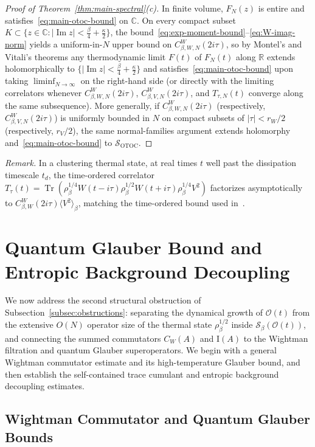 \documentclass[11pt,a4paper]{article}
\numberwithin{equation}{section}
\theoremstyle{plain}
\theoremstyle{definition}
\newcommand{\Tr}{\operatorname{Tr}}
\begin{document}
\begin{proof}[Proof of Theorem~\ref{thm:main-spectral}(c)]
In finite volume, $F_N(z)$ is entire and satisfies~\eqref{eq:main-otoc-bound} on $\mathbb{C}$. On every compact subset $K\subset\{z\in\mathbb{C} : |\operatorname{Im}z| < \frac{\beta}{4}+\frac{\kappa}{2}\}$, the bound~\eqref{eq:exp-moment-bound}--\eqref{eq:W-imag-norm} yields a uniform-in-$N$ upper bound on $C_{\beta,W,N}^W(2i\tau)$, so by Montel's and Vitali's theorems any thermodynamic limit $F(t)$ of $F_N(t)$ along $\mathbb{R}$ extends holomorphically to $\{|\operatorname{Im}z| < \frac{\beta}{4}+\frac{\kappa}{2}\}$ and satisfies~\eqref{eq:main-otoc-bound} upon taking $\liminf_{N\to\infty}$ on the right-hand side (or directly with the limiting correlators whenever $C_{\beta,W,N}^W(2i\tau)$, $C_{\beta,V,N}^W(2i\tau)$, and $T_{\tau,N}(t)$ converge along the same subsequence). More generally, if $C_{\beta,W,N}^W(2i\tau)$ (respectively, $C_{\beta,V,N}^W(2i\tau)$) is uniformly bounded in $N$ on compact subsets of $|\tau| < r_W/2$ (respectively, $r_V/2$), the same normal-families argument extends holomorphy and~\eqref{eq:main-otoc-bound} to $\mathcal{S}_{\mathrm{OTOC}}$.
\end{proof}

\noindent\emph{Remark.}
In a clustering thermal state, at real times $t$ well past the dissipation timescale $t_d$, the time-ordered correlator $T_\tau(t) = \Tr(\rho_\beta^{1/4}W(t-i\tau)\rho_\beta^{1/2}W(t+i\tau)\rho_\beta^{1/4}V^2)$ factorizes asymptotically to $C_{\beta,W}^W(2i\tau)\langle V^2\rangle_\beta$, matching the time-ordered bound used in~\cite{MSS2016}.

\section{Quantum Glauber Bound and Entropic Background Decoupling}\label{sec:entropic}

We now address the second structural obstruction of Subsection~\ref{subsec:obstructions}: separating the dynamical growth of $\mathcal{O}(t)$ from the extensive $O(N)$ operator size of the thermal state $\rho_\beta^{1/2}$ inside $\mathcal{S}_\beta(\mathcal{O}(t))$, and connecting the summed commutators $C_W(A)$ and $\mathrm{I}(A)$ to the Wightman filtration and quantum Glauber superoperators. We begin with a general Wightman commutator estimate and its high-temperature Glauber bound, and then establish the self-contained trace cumulant and entropic background decoupling estimates.

\subsection{Wightman Commutator and Quantum Glauber Bounds}\label{subsec:1d-comm}
\end{document}
